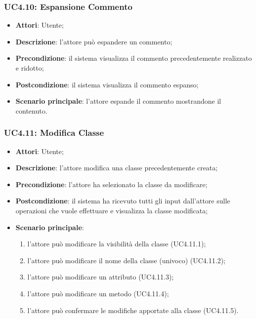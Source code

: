 \subsubsection{UC4.10: Espansione Commento	}
\label{UC4.10}
\begin{itemize}
\item \textbf{Attori}: Utente;
\item \textbf{Descrizione}: l'attore può espandere un commento;	
\item \textbf{Precondizione}: il sistema visualizza il commento precedentemente realizzato e ridotto;	
\item \textbf{Postcondizione}: il sistema visualizza il commento espanso;	
\item \textbf{Scenario principale}:
l'attore espande il commento mostrandone il contenuto.	
\end{itemize}

\subsubsection{UC4.11: Modifica Classe}
\label{UC4.11}
\begin{itemize}
\item \textbf{Attori}: Utente;
\item \textbf{Descrizione}: l'attore modifica una classe precedentemente creata; 
\item \textbf{Precondizione}: l'attore ha selezionato la classe da modificare;	
\item \textbf{Postcondizione}: il sistema ha ricevuto tutti gli input dall'attore sulle operazioni che vuole effettuare e visualizza la classe modificata;
\item \textbf{Scenario principale}:
\begin{enumerate}
	\item l'attore può modificare la visibilità della classe (UC4.11.1);
	\item l'attore può modificare il nome della classe (univoco) (UC4.11.2);
	\item l'attore può modificare un attributo (UC4.11.3);
	\item l'attore può modificare un metodo (UC4.11.4);
	\item l'attore può confermare le modifiche apportate alla classe (UC4.11.5).
\end{enumerate}
\end{itemize}


